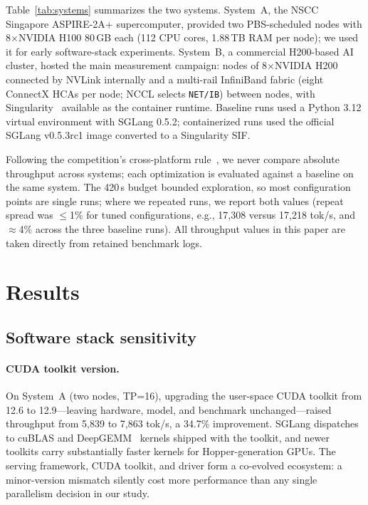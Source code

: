 \documentclass[sigconf]{acmart}
\begin{document}
Table~\ref{tab:systems} summarizes the two systems. System~A, the NSCC Singapore ASPIRE-2A+ supercomputer, provided two PBS-scheduled nodes with 8$\times$NVIDIA H100 80\,GB each (112 CPU cores, 1.88\,TB RAM per node); we used it for early software-stack experiments. System~B, a commercial H200-based AI cluster, hosted the main measurement campaign: nodes of 8$\times$NVIDIA H200 connected by NVLink internally and a multi-rail InfiniBand fabric (eight ConnectX HCAs per node; NCCL selects \texttt{NET/IB}) between nodes, with Singularity~\cite{kurtzer2017singularity} available as the container runtime. Baseline runs used a Python 3.12 virtual environment with SGLang 0.5.2; containerized runs used the official SGLang v0.5.3rc1 image converted to a Singularity SIF.

Following the competition's cross-platform rule~\cite{apachpcai2025}, we never compare absolute throughput across systems; each optimization is evaluated against a baseline on the same system. The 420\,s budget bounded exploration, so most configuration points are single runs; where we repeated runs, we report both values (repeat spread was $\le$1\% for tuned configurations, e.g., 17{,}308 versus 17{,}218 tok/s, and $\approx$4\% across the three baseline runs). All throughput values in this paper are taken directly from retained benchmark logs.

\section{Results}
\label{sec:results}

\subsection{Software stack sensitivity}
\label{sec:stack}
\paragraph{CUDA toolkit version.}
On System~A (two nodes, TP=16), upgrading the user-space CUDA toolkit from 12.6 to 12.9---leaving hardware, model, and benchmark unchanged---raised throughput from 5{,}839 to 7{,}863 tok/s, a 34.7\% improvement. SGLang dispatches to cuBLAS and DeepGEMM~\cite{deepgemm} kernels shipped with the toolkit, and newer toolkits carry substantially faster kernels for Hopper-generation GPUs. The serving framework, CUDA toolkit, and driver form a co-evolved ecosystem: a minor-version mismatch silently cost more performance than any single parallelism decision in our study.
\end{document}
